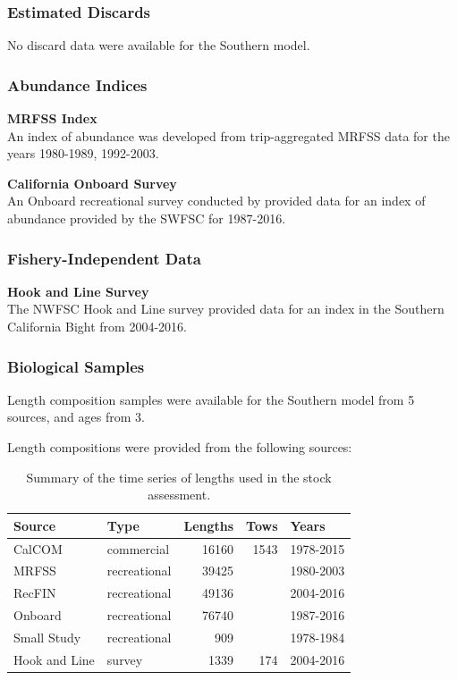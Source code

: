 \documentclass[12pt,]{article}
\begin{document}
\subsubsection{Estimated Discards}\label{estimated-discards-1}

No discard data were available for the Southern model.

\subsubsection{Abundance Indices}\label{abundance-indices-1}

\textbf{MRFSS Index}\\
An index of abundance was developed from trip-aggregated MRFSS data for
the years 1980-1989, 1992-2003.

\textbf{California Onboard Survey}\\
An Onboard recreational survey conducted by provided data for an index
of abundance provided by the SWFSC for 1987-2016.

\subsubsection{Fishery-Independent
Data}\label{fishery-independent-data-1}

\textbf{Hook and Line Survey}\\
The NWFSC Hook and Line survey provided data for an index in the
Southern California Bight from 2004-2016.

\subsubsection{Biological Samples}\label{biological-samples-1}

Length composition samples were available for the Southern model from 5
sources, and ages from 3.

Length compositions were provided from the following sources:

\vspace{.5cm}

\begin{table}[ht]
\centering
\caption{Summary of the time series of lengths used in the stock assessment.} 
\label{tab:Length_sources}
\begin{tabular}{llrrl}
  \hline
Source & Type & Lengths & Tows & Years \\ 
  \hline
CalCOM & commercial & 16160 & 1543 & 1978-2015 \\ 
  MRFSS & recreational & 39425 &  & 1980-2003 \\ 
  RecFIN & recreational & 49136 &  & 2004-2016 \\ 
  Onboard & recreational & 76740 &  & 1987-2016 \\ 
  Small Study & recreational & 909 &  & 1978-1984 \\ 
  Hook and Line & survey & 1339 & 174 & 2004-2016 \\ 
   \hline
\end{tabular}
\end{table}
\end{document}
